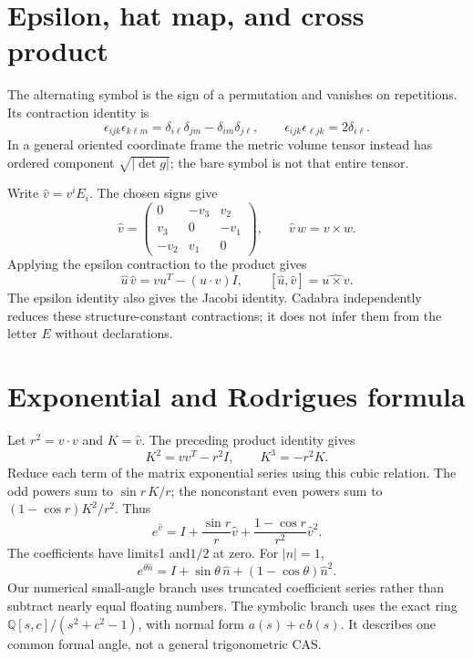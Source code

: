\documentclass{article}
\begin{document}
\section{Epsilon, hat map, and cross product}
The alternating symbol is the sign of a permutation and vanishes on
repetitions. Its contraction identity is
\[
 \epsilon_{ijk}\epsilon_{k\ell m}
 =\delta_{i\ell}\delta_{jm}-\delta_{im}\delta_{j\ell},
 \qquad \epsilon_{ijk}\epsilon_{\ell jk}=2\delta_{i\ell}.
\]
In a general oriented coordinate frame the metric volume tensor instead has
ordered component $\sqrt{|\det g|}$; the bare symbol is not that entire tensor.

Write $\widehat v=v^iE_i$. The chosen signs give
\[
 \widehat v=\begin{pmatrix}0&-v_3&v_2\\v_3&0&-v_1\\-v_2&v_1&0\end{pmatrix},
 \qquad \widehat v\,w=v\times w .
\]
Applying the epsilon contraction to the product gives
\[
 \widehat u\,\widehat v=vu^T-(u\cdot v)I,\qquad
 [\widehat u,\widehat v]=\widehat{u\times v}.
\]
The epsilon identity also gives the Jacobi identity. Cadabra independently
reduces these structure-constant contractions; it does not infer them from
the letter $E$ without declarations.

\section{Exponential and Rodrigues formula}
Let $r^2=v\cdot v$ and $K=\widehat v$. The preceding product identity gives
\[
 K^2=vv^T-r^2I,\qquad K^3=-r^2K .
\]
Reduce each term of the matrix exponential series using this cubic relation.
The odd powers sum to $\sin r\,K/r$; the nonconstant even powers sum to
$(1-\cos r)K^2/r^2$. Thus
\[
 e^{\widehat v}=I+\frac{\sin r}{r}\widehat v+
                 \frac{1-\cos r}{r^2}\widehat v^2.
\]
The coefficients have limits1 and$1/2$ at zero. For $|n|=1$,
\[
 e^{\theta\widehat n}
 =I+\sin\theta\,\widehat n+(1-\cos\theta)\widehat n^2.
\]
Our numerical small-angle branch uses truncated coefficient series rather
than subtract nearly equal floating numbers. The symbolic branch uses the
exact ring $\mathbb Q[s,c]/(s^2+c^2-1)$, with normal form $a(s)+c\,b(s)$.
It describes one common formal angle, not a general trigonometric CAS.
\end{document}
